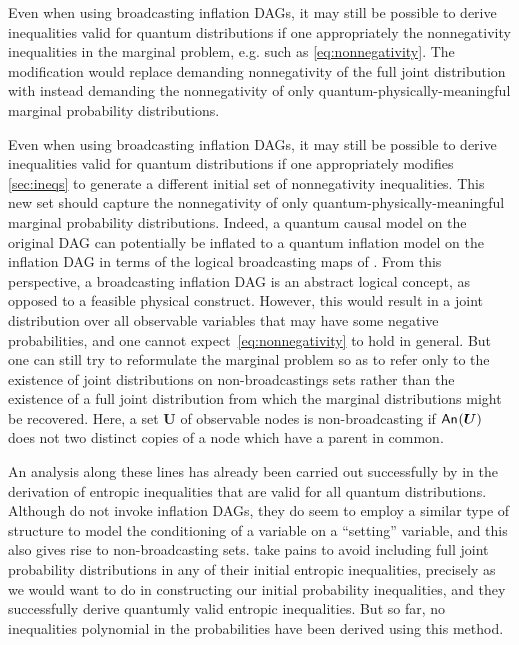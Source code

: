 Even when using broadcasting inflation DAGs, it may still be possible to derive inequalities valid for quantum distributions if one appropriately the nonnegativity inequalities in the marginal problem, e.g. such as \cref{eq:nonnegativity}. The modification would replace demanding nonnegativity of the full joint distribution with instead demanding the nonnegativity of only quantum-physically-meaningful marginal probability distributions. 

Even when using broadcasting inflation DAGs, it may still be possible to derive inequalities valid for quantum distributions if one appropriately modifies \cref{sec:ineqs} to generate a different initial set of nonnegativity inequalities. This new set should capture the nonnegativity of only quantum-physically-meaningful marginal probability distributions. Indeed, a quantum causal model on the original DAG can potentially be inflated to a quantum inflation model on the inflation DAG in terms of the logical broadcasting maps of \citet{Coecke2011}. From this perspective, a broadcasting inflation DAG is an abstract logical concept, as opposed to a feasible physical construct. However, this would result in a joint distribution over all observable variables that may have some negative probabilities, and one cannot expect~\cref{eq:nonnegativity} to hold in general. But one can still try to reformulate the marginal problem so as to refer only to the existence of joint distributions on non-broadcastings sets rather than the existence of a full joint distribution from which the marginal distributions might be recovered. Here, a set $\bm{U}$ of observable nodes is non-broadcasting if ${\mathsf{An}_{}}\lparen\bm{U}\rparen$ does not two distinct copies of a node which have a parent in common.

An analysis along these lines has already been carried out successfully by \citet{Chaves2015infoquantum} in the derivation of entropic inequalities that are valid for all quantum distributions. Although \citet{Chaves2015infoquantum} do not invoke inflation DAGs, they do seem to employ a similar type of structure to model the conditioning of a variable on a ``setting'' variable, and this also gives rise to non-broadcasting sets. \citet{Chaves2015infoquantum} take pains to avoid including full joint probability distributions in any of their initial entropic inequalities, precisely as we would want to do in constructing our initial probability inequalities, and they successfully derive quantumly valid entropic inequalities. But so far, no inequalities polynomial in the probabilities have been derived using this method.

